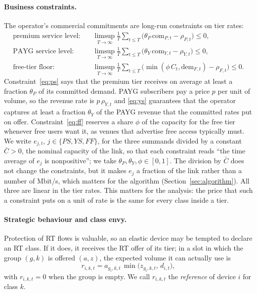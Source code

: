 \documentclass[preprint,11pt]{elsarticle}
\theoremstyle{definition}
\theoremstyle{remark}
\newcommand{\dem}{\mathrm{dem}}
\begin{document}
\paragraph{Business constraints.}
The operator's commercial commitments are long-run constraints on tier rates:
\begin{align}
\text{premium service level:}\quad &\limsup_{T\to\infty}\frac1T\sum_{t\le T}\big(\theta_P\,\mathrm{com}_{P,t}-\rho_{P,t}\big)\le 0,\label{eq:ps}\\
\text{PAYG service level:}\quad &\limsup_{T\to\infty}\frac1T\sum_{t\le T}\big(\theta_Y\,\mathrm{com}_{Y,t}-\rho_{Y,t}\big)\le 0,\label{eq:ys}\\
\text{free-tier floor:}\quad &\limsup_{T\to\infty}\frac1T\sum_{t\le T}\big(\min(\phi\,C_t,\dem_{F,t})-\rho_{F,t}\big)\le 0.\label{eq:ff}
\end{align}
Constraint~\eqref{eq:ps} says that the premium tier receives on average at least a fraction $\theta_P$ of its committed demand.
PAYG subscribers pay a price $p$ per unit of volume, so the revenue rate is $p\,\rho_{Y,t}$ and \eqref{eq:ys} guarantees that the operator captures at least a fraction $\theta_Y$ of the PAYG revenue that the committed rates put on offer.
Constraint~\eqref{eq:ff} reserves a share $\phi$ of the capacity for the free tier whenever free users want it, as venues that advertise free access typically must.
We write $e_{j,t}$, $j\in\{PS,YS,FF\}$, for the three summands divided by a constant $\bar C>0$, the nominal capacity of the link, so that each constraint reads ``the time average of $e_j$ is nonpositive''; we take $\theta_P,\theta_Y,\phi\in[0,1]$.
The division by $\bar C$ does not change the constraints, but it makes $e_j$ a fraction of the link rather than a number of Mbit/s, which matters for the algorithm (Section~\ref{sec:algorithm}).
All three are linear in the tier rates. This matters for the analysis: the price that such a constraint puts on a unit of rate is the same for every class inside a tier.

\paragraph{Strategic behaviour and class envy.}
Protection of RT flows is valuable, so an elastic device may be tempted to declare an RT class.
If it does, it receives the RT offer of its tier; in a slot in which the group $(g,k)$ is offered $(a,z)$, the expected volume it can actually use is
\begin{equation}\label{eq:ref}
r_{i,k,t}=a_{g_i,k,t}\,\min\big(z_{g_i,k,t},\,d_{i,t}\big),
\end{equation}
with $r_{i,k,t}=0$ when the group is empty.
We call $r_{i,k,t}$ the \emph{reference} of device $i$ for class $k$.
\end{document}
